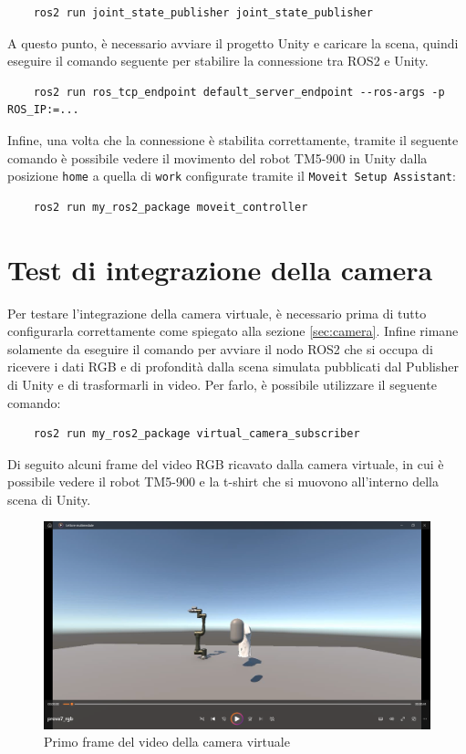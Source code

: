 \documentclass[11pt]{report}
\begin{document}
\begin{verbatim}
    ros2 run joint_state_publisher joint_state_publisher
\end{verbatim}

A questo punto, è necessario avviare il progetto Unity e caricare la scena, quindi eseguire il comando seguente per stabilire la connessione tra ROS2 e Unity.
\begin{verbatim}
    ros2 run ros_tcp_endpoint default_server_endpoint --ros-args -p ROS_IP:=... 
\end{verbatim}

Infine, una volta che la connessione è stabilita correttamente, tramite il seguente comando è possibile vedere il movimento del robot TM5-900 in Unity dalla posizione \texttt{home} a quella di \texttt{work} configurate tramite il \texttt{Moveit Setup Assistant}:

\begin{verbatim}
    ros2 run my_ros2_package moveit_controller
\end{verbatim}


\section{Test di integrazione della camera}
\label{sec:Test_camera} 
Per testare l'integrazione della camera virtuale, è necessario prima di tutto configurarla correttamente come spiegato alla sezione \ref{sec:camera}. Infine rimane solamente da eseguire il comando per avviare il nodo ROS2 che si occupa di ricevere i dati RGB e di profondità dalla scena simulata pubblicati dal Publisher di Unity e di trasformarli in video. Per farlo, è possibile utilizzare il seguente comando:

\begin{verbatim}
    ros2 run my_ros2_package virtual_camera_subscriber
\end{verbatim}

Di seguito alcuni frame del video RGB ricavato dalla camera virtuale, in cui è possibile vedere il robot TM5-900 e la t-shirt che si muovono all'interno della scena di Unity. 

\begin{figure} [H]
    \centering
    \includegraphics[width=1\textwidth]{images/frame_video_1.PNG}
    \caption{Primo frame del video della camera virtuale}
    \label{fig:frame_video_1}
\end{figure}
\end{document}
